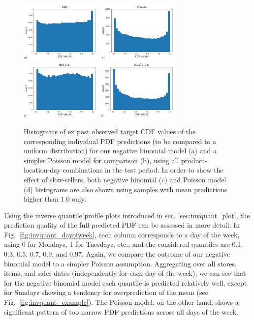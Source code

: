 \documentclass[BCOR=1mm, DIV=calc,10pt,
twoside=true,
twocolumn,
headings=normal]{scrartcl}
\newcommand{\fig}{Fig.~}
\begin{document}
\begin{figure}
\begin{center}
\includegraphics[width=4cm]{cdf_truth_nbinom}
\includegraphics[width=4cm]{cdf_truth_poisson}
\includegraphics[width=4cm]{cdf_truth_nbinom_larger1}
\includegraphics[width=4cm]{cdf_truth_poisson_larger1}
\caption{\label{fig:cdf_demand} Histograms of ex post observed target CDF values of the corresponding individual PDF predictions (to be compared to a uniform distribution) for our negative binomial model (a) and a simpler Poisson model for comparison (b), using all product-location-day combinations in the test period. In order to show the effect of slow-sellers, both negative binomial (c) and Poisson model (d) histograms are also shown using samples with mean predictions higher than $1.0$ only.}
\end{center}
\end{figure}

Using the inverse quantile profile plots introduced in sec. \ref{sec:invquant_plot}, the prediction quality of the full predicted PDF can be assessed in more detail. In \fig \ref{fig:invquant_dayofweek}, each column corresponds to a day of the week, using 0 for Mondays, 1 for Tuesdays, etc., and the considered quantiles are 0.1, 0.3, 0.5, 0.7, 0.9, and 0.97. Again, we compare the outcome of our negative binomial model to a simpler Poisson assumption. Aggregating over all stores, items, and sales dates (independently for each day of the week), we can see that for the negative binomial model each quantile is predicted relatively well, except for Sundays showing a tendency for overprediction of the mean (see \fig \ref{fig:invquant_example}). The Poisson model, on the other hand, shows a significant pattern of too narrow PDF predictions across all days of the week.
\end{document}
